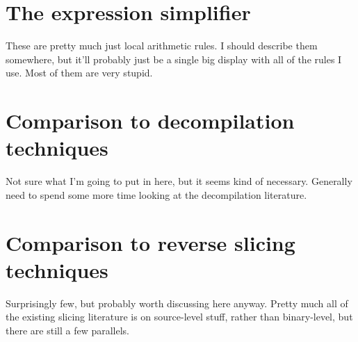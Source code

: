 \section{The expression simplifier}
These are pretty much just local arithmetic rules.
I should describe them somewhere, but it'll probably just be a single big display with all of the rules I use.
Most of them are very stupid.

\section{Comparison to decompilation techniques}
Not sure what I'm going to put in here, but it seems kind of necessary.
Generally need to spend some more time looking at the decompilation literature.


\section{Comparison to reverse slicing techniques}
Surprisingly few, but probably worth discussing here anyway.
Pretty much all of the existing slicing literature is on source-level stuff, rather than binary-level, but there are still a few parallels.

